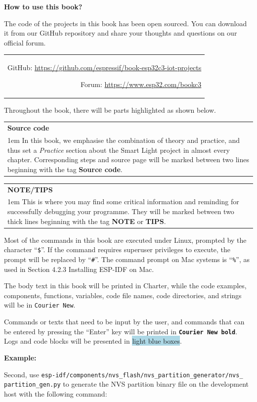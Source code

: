 \documentclass[a4paper,12pt,openany]{book}
\newcommand{\note}[2][NOTE]{ %
\vspace{6pt}
\begin{tabular}{b{\textwidth}}
\hline
\fontfamily{phv}\selectfont \textbf{#1}\\
\leftskip 1em #2\\
\hline
\end{tabular}
}
\begin{document}
\newpage
\begin{center}
    \textcolor{Title}{\LARGE\bfseries How to use this book?}
\end{center}

\vspace{6pt}
The code of the projects in this book has been open sourced. You can download it from our GitHub repository and share your thoughts and questions on our official forum.

\begin{tabular}{d}
    GitHub: \url{https://github.com/espressif/book-esp32c3-iot-projects}
    
    Forum: \url{https://www.esp32.com/bookc3}
\end{tabular}

Throughout the book, there will be parts highlighted as shown below.

\note[Source code]{In this book, we emphasise the combination of theory and practice, and thus set a \textit{Practice} section about the Smart Light project in almost every chapter. Corresponding steps and source page will be marked between two lines beginning with the tag \textbf{Source code}.}

\vspace{6pt}
\note[NOTE/TIPS]{This is where you may find some critical information and reminding for successfully debugging your programme. They will be marked between two thick lines beginning with the tag \textbf{NOTE} or \textbf{TIPS}.}

Most of the commands in this book are executed under Linux, prompted by the character “\verb|$|”. If the command requires superuser privileges to execute, the prompt will be replaced by “\verb|#|”. The command prompt on Mac systems is “\verb|%|”, as used in Section 4.2.3 Installing ESP-IDF on Mac.

The body text in this book will be printed in Charter, while the code examples, components, functions, variables, code file names, code directories, and strings will be in \texttt{Courier New}.

Commands or texts that need to be input by the user, and commands that can be entered by pressing the “Enter” key will be printed in \textbf{\texttt{Courier New bold}}. Logs and code blocks will be presented in \colorbox{LightBlue}{light blue boxes}.

\vspace{6pt}
\textcolor{Title}{\large\bfseries Example:}

Second, use \texttt{esp-idf/components/nvs\_flash/nvs\_partition\_generator/nvs\_\\
partition\_gen.py} to generate the NVS partition binary file on the development host with the following command:
\end{document}
